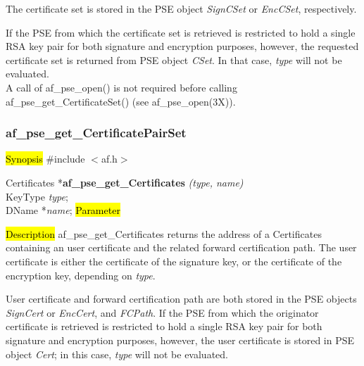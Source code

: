 The certificate set is stored in the PSE object
{\em SignCSet} or {\em EncCSet}, respectively.

If the PSE from which the certificate set is retrieved is restricted to hold a single RSA key pair
for both signature and encryption purposes, however, the requested certificate set is returned
from PSE object {\em CSet}. In that case, {\em type} will not be evaluated.
\\ [1em]
A call of af\_pse\_open() is not required before calling af\_pse\_get\_CertificateSet()
(see af\_pse\_open(3X)).

\subsubsection{af\_pse\_get\_CertificatePairSet}
\label{af_get_Certificates}
\hl{Synopsis}
\#include $<$af.h$>$ 

Certificates *{\bf af\_pse\_get\_Certificates} {\em (type, name)} \\
KeyType {\em type}; \\
DName *{\em name};
\hl{Parameter}


\hl{Description}
af\_pse\_get\_Certificates returns the address of a Certificates containing an user certificate and the 
related forward 
certification path. The user certificate is either the certificate of the signature key,
or the certificate of the encryption key, depending on {\em type}.

User certificate and forward certification path are both stored
in the PSE objects {\em SignCert} or {\em EncCert}, and {\em FCPath}. If the PSE from which the originator certificate 
is retrieved is restricted to hold a single RSA key pair
for both signature and encryption purposes, however, the user certificate is stored in PSE object {\em Cert}; in this case, 
{\em type} will not be evaluated.

